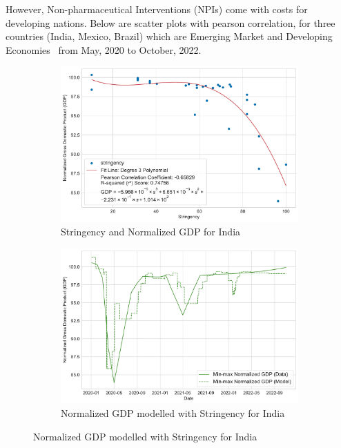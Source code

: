 \documentclass[tikz,fleqn,12pt]{wlscirep}
\begin{document}
However, Non-pharmaceutical Interventions (NPIs) come with costs for developing nations. Below are scatter plots with pearson correlation, for three countries (India, Mexico, Brazil) which are Emerging Market and Developing Economies~\cite{IMFCovid} from May, 2020 to October, 2022.
\begin{figure}[htbp!]
  \centering
  \caption{Stringency and GDP for Developing Economies}
  \begin{subfigure}[t]{0.48\textwidth}
    \centering
    \includegraphics[width=\linewidth]{images/stringency_vs_gdp_IND.pdf}
    \caption{Stringency and Normalized GDP for India}
  \end{subfigure}
  \label{fig:stringency_vs_gdp_IND}
  \hfill
  \begin{subfigure}[t]{0.48\textwidth}
    \centering
    \includegraphics[width=\linewidth]{images/gdp_modelled_with_stringency_IND.pdf}
    \caption{Normalized GDP modelled with Stringency for India}
  \end{subfigure}
  \label{fig:gdp_modelled_with_stringency_IND}


\end{figure}
\end{document}
